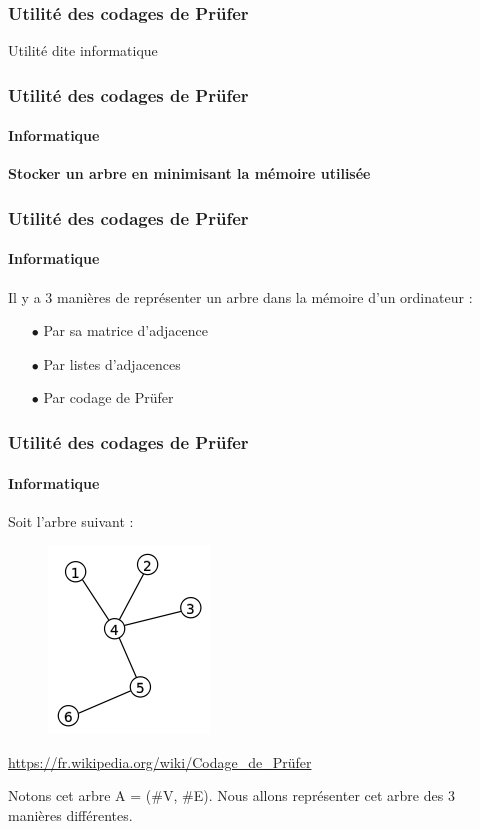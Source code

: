 \documentclass[11pt]{beamer}
\begin{document}
\begin{frame}
\frametitle{Utilité des codages de Prüfer}

\begin{center}
\LARGE{Utilité dite informatique}
\end{center}

\end{frame}

\begin{frame}
\frametitle{Utilité des codages de Prüfer}
\framesubtitle{Informatique}

\begin{center}
\textbf{Stocker un arbre en minimisant la mémoire utilisée}
\end{center}
\end{frame}

\begin{frame}
\frametitle{Utilité des codages de Prüfer}
\framesubtitle{Informatique}

Il y a 3 manières de représenter un arbre dans la mémoire d'un ordinateur :\\

\begin{enumerate}
\item[$\bullet$]Par sa matrice d'adjacence
\item[$\bullet$]Par listes d'adjacences
\item[$\bullet$]Par codage de Prüfer
\end{enumerate}
\end{frame}

\begin{frame}
\frametitle{Utilité des codages de Prüfer}
\framesubtitle{Informatique}

Soit l'arbre suivant :\\
\begin{figure}[!ht] \center
\includegraphics[scale=0.40]{exempleArbre.png}
\end{figure}
\begin{center}
\tiny{\url{https://fr.wikipedia.org/wiki/Codage_de_Prüfer}}
\end{center}

Notons cet arbre A = ($\#$V, $\#$E).
Nous allons représenter cet arbre des 3 manières différentes.
\end{frame}
\end{document}
